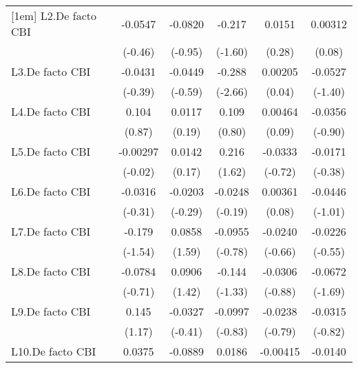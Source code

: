 {\begin{longtable}{l*{5}{c}}
[1em]
L2.De facto CBI &  -0.0547         &  -0.0820         &   -0.217         &   0.0151         &  0.00312         \\
                &  (-0.46)         &  (-0.95)         &  (-1.60)         &   (0.28)         &   (0.08)         \\
[1em]
L3.De facto CBI &  -0.0431         &  -0.0449         &   -0.288\sym{**} &  0.00205         &  -0.0527         \\
                &  (-0.39)         &  (-0.59)         &  (-2.66)         &   (0.04)         &  (-1.40)         \\
[1em]
L4.De facto CBI &    0.104         &   0.0117         &    0.109         &  0.00464         &  -0.0356         \\
                &   (0.87)         &   (0.19)         &   (0.80)         &   (0.09)         &  (-0.90)         \\
[1em]
L5.De facto CBI & -0.00297         &   0.0142         &    0.216         &  -0.0333         &  -0.0171         \\
                &  (-0.02)         &   (0.17)         &   (1.62)         &  (-0.72)         &  (-0.38)         \\
[1em]
L6.De facto CBI &  -0.0316         &  -0.0203         &  -0.0248         &  0.00361         &  -0.0446         \\
                &  (-0.31)         &  (-0.29)         &  (-0.19)         &   (0.08)         &  (-1.01)         \\
[1em]
L7.De facto CBI &   -0.179         &   0.0858         &  -0.0955         &  -0.0240         &  -0.0226         \\
                &  (-1.54)         &   (1.59)         &  (-0.78)         &  (-0.66)         &  (-0.55)         \\
[1em]
L8.De facto CBI &  -0.0784         &   0.0906         &   -0.144         &  -0.0306         &  -0.0672         \\
                &  (-0.71)         &   (1.42)         &  (-1.33)         &  (-0.88)         &  (-1.69)         \\
[1em]
L9.De facto CBI &    0.145         &  -0.0327         &  -0.0997         &  -0.0238         &  -0.0315         \\
                &   (1.17)         &  (-0.41)         &  (-0.83)         &  (-0.79)         &  (-0.82)         \\
[1em]
L10.De facto CBI&   0.0375         &  -0.0889         &   0.0186         & -0.00415         &  -0.0140         \\

\end{longtable}}
